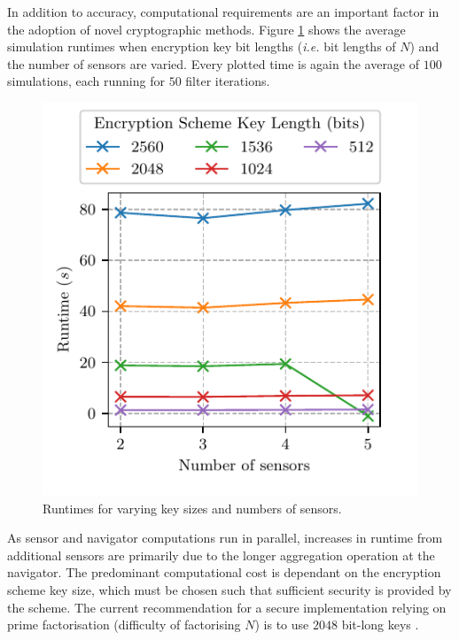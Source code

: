 \documentclass[twocolumn]{autart}
\begin{document}
In addition to accuracy, computational requirements are an important factor in the adoption of novel cryptographic methods. Figure \ref{fig:sim_timing} shows the average simulation runtimes when encryption key bit lengths (\textit{i.e.} bit lengths of $N$) and the number of sensors are varied. Every plotted time is again the average of $100$ simulations, each running for $50$ filter iterations. 
\begin{figure}[htbp]
\begin{center}
    \includegraphics{images/timing.pdf}
\end{center}
\caption{Runtimes for varying key sizes and numbers of sensors.}
\label{fig:sim_timing}
\end{figure}
As sensor and navigator computations run in parallel, increases in runtime from additional sensors are primarily due to the longer aggregation operation at the navigator. The predominant computational cost is dependant on the encryption scheme key size, which must be chosen such that sufficient security is provided by the scheme. The current recommendation for a secure implementation relying on prime factorisation (difficulty of factorising $N$) is to use $2048$ bit-long keys \cite{barkerRecommendationPairwiseKey2019}.

% 
%                                               
%                                               
%                                               
% 
\end{document}

